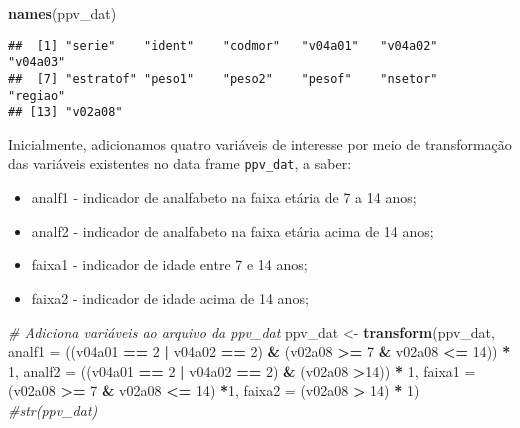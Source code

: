 \documentclass[]{book}
\newenvironment{Shaded}{\begin{snugshade}}{\end{snugshade}}
\newcommand{\KeywordTok}[1]{\textcolor[rgb]{0.13,0.29,0.53}{\textbf{#1}}}
\newcommand{\DataTypeTok}[1]{\textcolor[rgb]{0.13,0.29,0.53}{#1}}
\newcommand{\DecValTok}[1]{\textcolor[rgb]{0.00,0.00,0.81}{#1}}
\newcommand{\StringTok}[1]{\textcolor[rgb]{0.31,0.60,0.02}{#1}}
\newcommand{\CommentTok}[1]{\textcolor[rgb]{0.56,0.35,0.01}{\textit{#1}}}
\newcommand{\OperatorTok}[1]{\textcolor[rgb]{0.81,0.36,0.00}{\textbf{#1}}}
\newcommand{\NormalTok}[1]{#1}
\providecommand{\tightlist}{%
  \setlength{\itemsep}{0pt}\setlength{\parskip}{0pt}}
\theoremstyle{definition}
\theoremstyle{definition}
\theoremstyle{definition}
\theoremstyle{remark}
\begin{document}
\begin{Shaded}
\begin{Highlighting}[]
\KeywordTok{names}\NormalTok{(ppv_dat)}
\end{Highlighting}
\end{Shaded}

\begin{verbatim}
##  [1] "serie"    "ident"    "codmor"   "v04a01"   "v04a02"   "v04a03"  
##  [7] "estratof" "peso1"    "peso2"    "pesof"    "nsetor"   "regiao"  
## [13] "v02a08"
\end{verbatim}

Inicialmente, adicionamos quatro variáveis de interesse por meio de
transformação das variáveis existentes no data frame \texttt{ppv\_dat},
a saber:

\begin{itemize}
\tightlist
\item
  analf1 - indicador de analfabeto na faixa etária de 7 a 14 anos;
\item
  analf2 - indicador de analfabeto na faixa etária acima de 14 anos;
\item
  faixa1 - indicador de idade entre 7 e 14 anos;
\item
  faixa2 - indicador de idade acima de 14 anos;
\end{itemize}

\begin{Shaded}
\begin{Highlighting}[]
\CommentTok{# Adiciona variáveis ao arquivo da ppv_dat}
\NormalTok{ppv_dat <-}\StringTok{ }\KeywordTok{transform}\NormalTok{(ppv_dat, }
\DataTypeTok{analf1 =}\NormalTok{ ((v04a01 }\OperatorTok{==}\StringTok{ }\DecValTok{2} \OperatorTok{|}\StringTok{ }\NormalTok{v04a02 }\OperatorTok{==}\StringTok{ }\DecValTok{2}\NormalTok{) }\OperatorTok{&}\StringTok{ }\NormalTok{(v02a08 }\OperatorTok{>=}\StringTok{ }\DecValTok{7} \OperatorTok{&}\StringTok{ }\NormalTok{v02a08 }\OperatorTok{<=}\StringTok{ }\DecValTok{14}\NormalTok{)) }\OperatorTok{*}\StringTok{ }\DecValTok{1}\NormalTok{, }
\DataTypeTok{analf2 =}\NormalTok{ ((v04a01 }\OperatorTok{==}\StringTok{ }\DecValTok{2} \OperatorTok{|}\StringTok{ }\NormalTok{v04a02 }\OperatorTok{==}\StringTok{ }\DecValTok{2}\NormalTok{) }\OperatorTok{&}\StringTok{ }\NormalTok{(v02a08 }\OperatorTok{>}\DecValTok{14}\NormalTok{)) }\OperatorTok{*}\StringTok{ }\DecValTok{1}\NormalTok{, }
\DataTypeTok{faixa1 =}\NormalTok{ (v02a08 }\OperatorTok{>=}\StringTok{ }\DecValTok{7} \OperatorTok{&}\StringTok{ }\NormalTok{v02a08 }\OperatorTok{<=}\StringTok{ }\DecValTok{14}\NormalTok{) }\OperatorTok{*}\DecValTok{1}\NormalTok{, }
\DataTypeTok{faixa2 =}\NormalTok{ (v02a08 }\OperatorTok{>}\StringTok{ }\DecValTok{14}\NormalTok{) }\OperatorTok{*}\StringTok{ }\DecValTok{1}\NormalTok{)}
\CommentTok{#str(ppv_dat)}
\end{Highlighting}
\end{Shaded}
\end{document}

